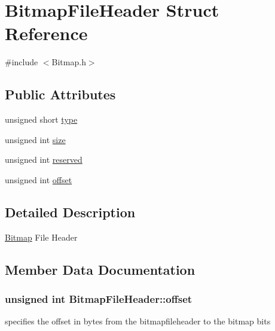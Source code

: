 \hypertarget{structBitmapFileHeader}{}\section{Bitmap\+File\+Header Struct Reference}
\label{structBitmapFileHeader}


{\ttfamily \#include $<$Bitmap.\+h$>$}

\subsection*{Public Attributes}
\begin{DoxyCompactItemize}
\item 
unsigned short \hyperlink{structBitmapFileHeader_a139c2c2645bc00ddf4f5dc552872c1d1}{type}
\item 
unsigned int \hyperlink{structBitmapFileHeader_a0dcad71d9b17783c4d296c2c6d00ede0}{size}
\item 
unsigned int \hyperlink{structBitmapFileHeader_ab3833d77e2c28a216859a80ba8fac9f0}{reserved}
\item 
unsigned int \hyperlink{structBitmapFileHeader_a26ed598693b100ffd9e29c4dc77f3d92}{offset}
\end{DoxyCompactItemize}


\subsection{Detailed Description}
\hyperlink{structBitmap}{Bitmap} File Header 

\subsection{Member Data Documentation}
\subsubsection[{\texorpdfstring{offset}{offset}}]{\setlength{\rightskip}{0pt plus 5cm}unsigned int Bitmap\+File\+Header\+::offset}\hypertarget{structBitmapFileHeader_a26ed598693b100ffd9e29c4dc77f3d92}{}\label{structBitmapFileHeader_a26ed598693b100ffd9e29c4dc77f3d92}
specifies the offset in bytes from the bitmapfileheader to the bitmap bits 
